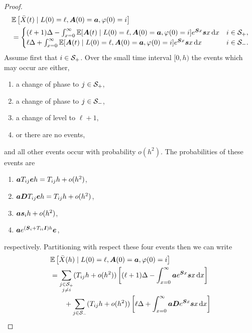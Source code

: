 \begin{proof}
	\begin{align}
		\nonumber&\mathbb E\left[\bar X(t)\mid L(0)=\ell,\bs A(0)=\bs a,\varphi(0)=i\right]   
%
	\\&=  \begin{cases}
			(\ell+1)\Delta - \int_{x=0}^\infty \mathbb E[\bs A(t) \mid L(0)=\ell,\bs A(0)=\bs a,\varphi(0)=i ]e^{\bs S x}\bs s x \wrt x & i \in\calS_+,\\
			\ell\Delta + \int_{x=0}^\infty \mathbb E[\bs A(t) \mid L(0)=\ell,\bs A(0)=\bs a,\varphi(0)=i ] e^{\bs S x}\bs s x \wrt x & i \in\calS_-.
		\end{cases}
		\label{eqn: askgh q}
	\end{align}
	Assume first that \(i\in\mathcal{S}_+\). Over the small time interval \([0,h)\) the events which may occur are either,
	\begin{enumerate}
		\item\label{item: kfj1} a change of phase to \(j\in\mathcal{S}_+\), 
		\item\label{item: kfj2} a change of phase to \(j\in\mathcal{S}_-\), 
		\item\label{item: kfj3} a change of level to \(\ell+1\), 
		\item\label{item: kfj4} or there are no events, 
	\end{enumerate}
	and all other events occur with probability \(o(h^2)\). The probabilities of these events are 
	\begin{enumerate}
		\item\label{item: kfj12} \(\boldsymbol a T_{ij}\boldsymbol e h = T_{ij}h + o(h^2)\), 
		\item\label{item: kfj22} \(\boldsymbol a \boldsymbol D T_{ij}\boldsymbol e h = T_{ij}h + o(h^2)\), 
		\item\label{item: kfj32} \(\boldsymbol a \boldsymbol s_i h + o(h^2)\), 
		\item\label{item: kfj42} \(\boldsymbol a e^{(\boldsymbol S_i + T_{ii}\boldsymbol I)h}\boldsymbol e\), 
	\end{enumerate}
	respectively. 
	Partitioning with respect these four events then we can write 
	\begin{align}
		&\mathbb E\left[\bar X(h)\mid L(0)=\ell,\bs A(0)=\bs a,\varphi(0)=i\right] \nonumber
		\\&= \sum_{\substack{j\in\mathcal S_+\\j\neq i}}(T_{ij}h + o(h^2)) \left[ (\ell+1)\Delta - \int_{x=0}^\infty \bs a e^{\bs Sx}\bs s x \wrt x\right] \nonumber 
		\\&\qquad{} + \sum_{j\in\mathcal S_-}(T_{ij}h + o(h^2)) \left[ \ell\Delta + \int_{x=0}^\infty \bs a\bs D e^{\bs Sx}\bs s x \wrt x\right] \nonumber

\end{align}
\end{proof}
